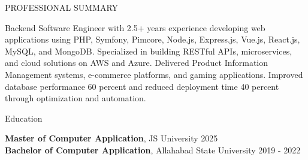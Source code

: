 \documentclass{resume} %
\begin{document}

\begin{rSection}{PROFESSIONAL SUMMARY}

{Backend Software Engineer with 2.5+ years experience developing web applications using PHP, Symfony, Pimcore, Node.js, Express.js, Vue.js, React.js, MySQL, and MongoDB. Specialized in building RESTful APIs, microservices, and cloud solutions on AWS and Azure. Delivered Product Information Management systems, e-commerce platforms, and gaming applications. Improved database performance 60 percent and reduced deployment time 40 percent through optimization and automation.}

\end{rSection}


\begin{rSection}{Education}

{\bf Master of Computer Application}, JS University \hfill {2025}\\
{\bf Bachelor of Computer Application}, Allahabad State University \hfill {2019 - 2022}

\end{rSection}
\end{document}
